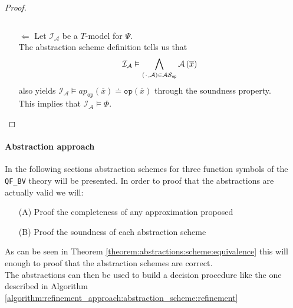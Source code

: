 \begin{theorem}
\begin{proof}
\begin{itemize}
\[        \]
    \item[$\Leftarrow$]  Let $\mathcal{I}_{\mathcal{A}}$ be a $T$-model for $\Psi$.\\
        The abstraction scheme definition tells us that
        \[
            \mathcal{I}_{\mathcal{A}} \vDash \bigwedge\limits_{\left({\mkern 2mu\cdot\mkern 2mu},\mathcal{A}\right)\in\mathcal{AS}_{\texttt{op}}} \mathcal{A}\left(\overline{x}\right)
        \] 
        also yields $\mathcal{I}_{\mathcal{A}} \vDash ap_{\texttt{op}}\left(\overline{x}\right) \doteq \texttt{op}\left(\overline{x}\right)$ through the soundness property.\\
        This implies that $\mathcal{I}_{\mathcal{A}} \vDash \Phi$.
\end{itemize}
\end{proof}
\end{theorem}

\paragraph{Abstraction approach}
In the following sections abstraction schemes for three function symbols of the \texttt{QF\_BV} theory will be presented.
In order to proof that the abstractions are actually valid we will:
\begin{itemize}
    \item[(A)] Proof the completeness of any approximation proposed
    \item[(B)] Proof the soundness of each abstraction scheme
\end{itemize}
As can be seen in Theorem \ref{theorem:abstractions:scheme:equivalence} this will enough to proof that the abstraction schemes are correct.\\
The abstractions can then be used to build a decision procedure like the one described in Algorithm \ref{algorithm:refinement_approach:abstraction_scheme:refinement}

